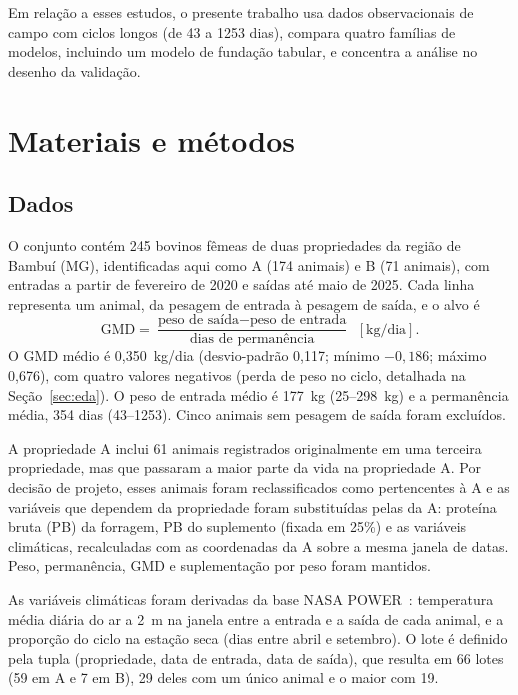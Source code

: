 \documentclass[conference]{IEEEtran}
\begin{document}
Em relação a esses estudos, o presente trabalho usa dados observacionais de campo com ciclos longos (de 43 a 1253 dias), compara quatro famílias de modelos, incluindo um modelo de fundação tabular, e concentra a análise no desenho da validação.

\section{Materiais e métodos}\label{sec:met}

\subsection{Dados}

O conjunto contém 245 bovinos fêmeas de duas propriedades da região de Bambuí (MG), identificadas aqui como A (174 animais) e B (71 animais), com entradas a partir de fevereiro de 2020 e saídas até maio de 2025. Cada linha representa um animal, da pesagem de entrada à pesagem de saída, e o alvo é
\begin{equation}
\mathrm{GMD} = \frac{\text{peso de sa\'ida} - \text{peso de entrada}}{\text{dias de perman\^encia}}\ \ [\text{kg/dia}].
\end{equation}
O GMD médio é 0,350~kg/dia (desvio-padrão 0,117; mínimo $-0{,}186$; máximo 0,676), com quatro valores negativos (perda de peso no ciclo, detalhada na Seção~\ref{sec:eda}). O peso de entrada médio é 177~kg (25--298~kg) e a permanência média, 354 dias (43--1253). Cinco animais sem pesagem de saída foram excluídos.

A propriedade A inclui 61 animais registrados originalmente em uma terceira propriedade, mas que passaram a maior parte da vida na propriedade A. Por decisão de projeto, esses animais foram reclassificados como pertencentes à A e as variáveis que dependem da propriedade foram substituídas pelas da A: proteína bruta (PB) da forragem, PB do suplemento (fixada em 25\%) e as variáveis climáticas, recalculadas com as coordenadas da A sobre a mesma janela de datas. Peso, permanência, GMD e suplementação por peso foram mantidos.

As variáveis climáticas foram derivadas da base NASA POWER~\cite{nasapower2026}: temperatura média diária do ar a 2~m na janela entre a entrada e a saída de cada animal, e a proporção do ciclo na estação seca (dias entre abril e setembro). O lote é definido pela tupla (propriedade, data de entrada, data de saída), que resulta em 66 lotes (59 em A e 7 em B), 29 deles com um único animal e o maior com 19.
\end{document}
